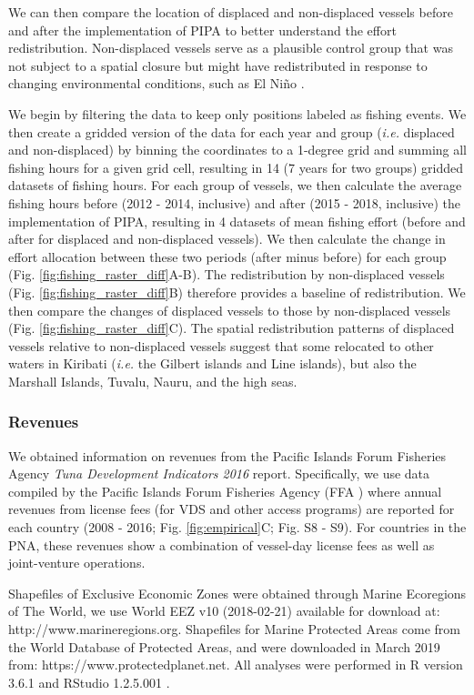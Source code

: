 \documentclass[12pt]{article}
\begin{document}
We can then compare the location of displaced and non-displaced vessels before and after the implementation of PIPA to better understand the effort redistribution. Non-displaced vessels serve as a plausible control group that was not subject to a spatial closure but might have redistributed in response to changing environmental conditions, such as El Ni\~no \cite{hanich2018unraveling,aqorau_2018}.

We begin by filtering the data to keep only positions labeled as fishing events. We then create a gridded version of the data for each year and group (\emph{i.e.} displaced and non-displaced) by binning the coordinates to a 1-degree grid and summing all fishing hours for a given grid cell, resulting in 14 (7 years for two groups) gridded datasets of fishing hours. For each group of vessels, we then calculate the average fishing hours before (2012 - 2014, inclusive) and after (2015 - 2018, inclusive) the implementation of PIPA, resulting in 4 datasets of mean fishing effort (before and after for displaced and non-displaced vessels). We then calculate the change in effort allocation between these two periods (after minus before) for each group (Fig. \ref{fig:fishing_raster_diff}A-B). The redistribution by non-displaced vessels (Fig. \ref{fig:fishing_raster_diff}B) therefore provides a baseline of redistribution. We then compare the changes of displaced vessels to those by non-displaced vessels (Fig. \ref{fig:fishing_raster_diff}C). The spatial redistribution patterns of displaced vessels relative to non-displaced vessels suggest that some relocated to other waters in Kiribati (\emph{i.e.} the Gilbert islands and Line islands), but also the Marshall Islands, Tuvalu, Nauru, and the high seas.

\subsubsection{Revenues}

We obtained information on revenues from the Pacific Islands Forum Fisheries Agency \emph{Tuna Development Indicators 2016} report.  Specifically, we use data compiled by the Pacific Islands Forum Fisheries Agency (FFA \cite{ffa_2017}) where annual revenues from license fees (for VDS and other access programs) are reported for each country (2008 - 2016; Fig. \ref{fig:empirical}C; Fig. S8 - S9). For countries in the PNA, these revenues show a combination of vessel-day license fees as well as joint-venture operations.

Shapefiles of Exclusive Economic Zones were obtained through Marine Ecoregions of The World, we use World EEZ v10 (2018-02-21) available for download at: http://www.marineregions.org. Shapefiles for Marine Protected Areas come from the World Database of Protected Areas, and were downloaded in March 2019 from: https://www.protectedplanet.net. All analyses were performed in R version 3.6.1 and RStudio 1.2.5.001 \cite{rcore_2019}.
\end{document}
